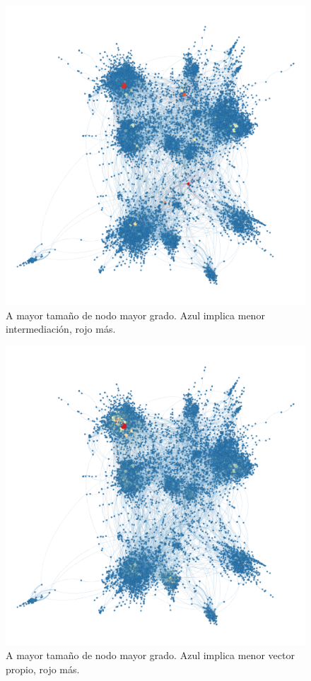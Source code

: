 \begin{figure}[ht]
    \centering
    \includegraphics[width=1\textwidth,angle=90]{img/resultados/grado-intermediacion.png}
    \caption{A mayor tamaño de nodo mayor grado. Azul implica menor intermediación, rojo más.}
\end{figure}

\begin{figure}[ht]
    \centering
    \includegraphics[width=1\textwidth,angle=90]{img/resultados/grado-vectorPropio.png}
    \caption{A mayor tamaño de nodo mayor grado. Azul implica menor vector propio, rojo más.}
\end{figure}

